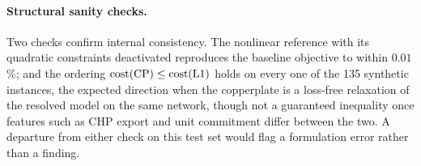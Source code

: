 \paragraph{Structural sanity checks.}
Two checks confirm internal consistency. The nonlinear reference with its quadratic
constraints deactivated reproduces the baseline objective to within $0.01$\,\%; and the
ordering $\mathrm{cost}(\mathrm{CP}) \le \mathrm{cost}(\mathrm{L1})$ holds on every one of the
135 synthetic instances, the expected direction when the copperplate is a loss-free relaxation
of the resolved model on the same network, though not a guaranteed inequality once features
such as CHP export and unit commitment differ between the two. A departure from either check
on this test set would flag a formulation error rather than a finding.
